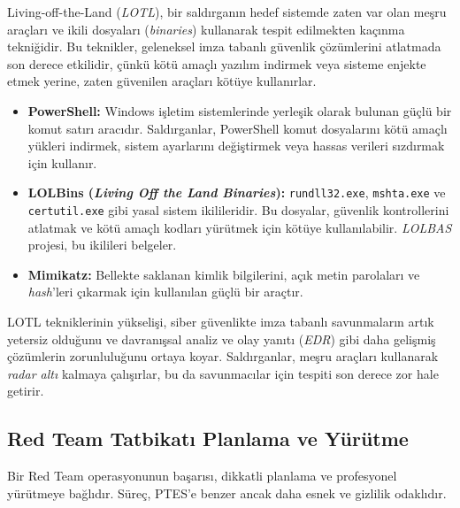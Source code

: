 Living-off-the-Land (\textit{LOTL}), bir saldırganın hedef sistemde zaten var olan meşru araçları ve ikili dosyaları (\textit{binaries}) kullanarak tespit edilmekten kaçınma tekniğidir. Bu teknikler, geleneksel imza tabanlı güvenlik çözümlerini atlatmada son derece etkilidir, çünkü kötü amaçlı yazılım indirmek veya sisteme enjekte etmek yerine, zaten güvenilen araçları kötüye kullanırlar.

\begin{itemize}
\item \textbf{PowerShell:} Windows işletim sistemlerinde yerleşik olarak bulunan güçlü bir komut satırı aracıdır. Saldırganlar, PowerShell komut dosyalarını kötü amaçlı yükleri indirmek, sistem ayarlarını değiştirmek veya hassas verileri sızdırmak için kullanır.
\item \textbf{LOLBins (\textit{Living Off the Land Binaries}):} \texttt{rundll32.exe}, \texttt{mshta.exe} ve \texttt{certutil.exe} gibi yasal sistem ikilileridir. Bu dosyalar, güvenlik kontrollerini atlatmak ve kötü amaçlı kodları yürütmek için kötüye kullanılabilir. \textit{LOLBAS} projesi, bu ikilileri belgeler.
\item \textbf{Mimikatz:} Bellekte saklanan kimlik bilgilerini, açık metin parolaları ve \textit{hash}'leri çıkarmak için kullanılan güçlü bir araçtır.
\end{itemize}

LOTL tekniklerinin yükselişi, siber güvenlikte imza tabanlı savunmaların artık yetersiz olduğunu ve davranışsal analiz ve olay yanıtı (\textit{EDR}) gibi daha gelişmiş çözümlerin zorunluluğunu ortaya koyar. Saldırganlar, meşru araçları kullanarak \textit{radar altı} kalmaya çalışırlar, bu da savunmacılar için tespiti son derece zor hale getirir.

\subsection{Red Team Tatbikatı Planlama ve Yürütme}

Bir Red Team operasyonunun başarısı, dikkatli planlama ve profesyonel yürütmeye bağlıdır. Süreç, PTES'e benzer ancak daha esnek ve gizlilik odaklıdır.

